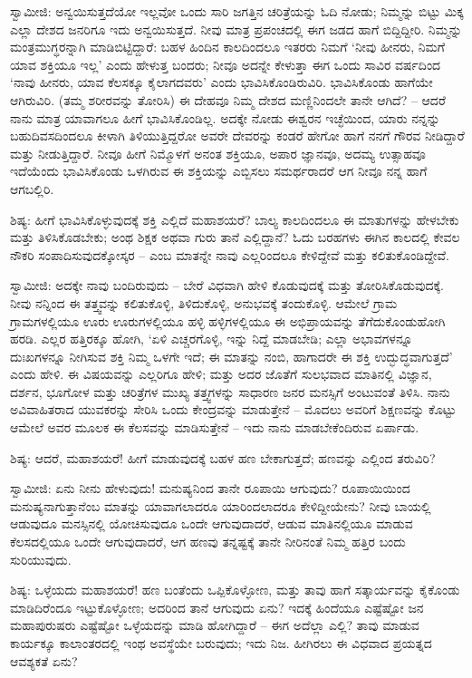 ಸ್ವಾಮೀಜಿ: ಅನ್ವಯಿಸುತ್ತದೆಯೋ ಇಲ್ಲವೋ ಒಂದು ಸಾರಿ ಜಗತ್ತಿನ ಚರಿತ್ರೆಯನ್ನು ಓದಿ ನೋಡು; ನಿಮ್ಮನ್ನು ಬಿಟ್ಟು ಮಿಕ್ಕ ಎಲ್ಲಾ ದೇಶದ ಜನರಿಗೂ ಇದು ಅನ್ವಯಿಸುತ್ತದೆ. ನೀವು ಮಾತ್ರ ಪ್ರಪಂಚದಲ್ಲಿ ಈಗ ಜಡದ ಹಾಗೆ ಬಿದ್ದಿದ್ದೀರಿ. ನಿಮ್ಮನ್ನು ಮಂತ್ರಮುಗ್ಧರನ್ನಾಗಿ ಮಾಡಿಬಿಟ್ಟಿದ್ದಾರೆ: ಬಹಳ ಹಿಂದಿನ ಕಾಲದಿಂದಲೂ ಇತರರು ನಿಮಗೆ ‘ನೀವು ಹೀನರು, ನಿಮಗೆ ಯಾವ ಶಕ್ತಿಯೂ ಇಲ್ಲ’ ಎಂದು ಹೇಳುತ್ತ ಬಂದರು; ನೀವೂ ಅದನ್ನೇ ಕೇಳುತ್ತಾ ಈಗ ಒಂದು ಸಾವಿರ ವರ್ಷದಿಂದ ‘ನಾವು ಹೀನರು, ಯಾವ ಕೆಲಸಕ್ಕೂ ಕೈಲಾಗದವರು’ ಎಂದು ಭಾವಿಸಿಕೊಂಡಿರುವಿರಿ. ಭಾವಿಸಿಕೊಂಡು ಹಾಗೆಯೇ ಆಗಿರುವಿರಿ. (ತಮ್ಮ ಶರೀರವನ್ನು ತೋರಿಸಿ) ಈ ದೇಹವೂ ನಿಮ್ಮ ದೇಶದ ಮಣ್ಣಿನಿಂದಲೇ ತಾನೇ ಆಗಿದೆ? – ಆದರೆ ನಾನು ಮಾತ್ರ ಯಾವಾಗಲೂ ಹೀಗೆ ಭಾವಿಸಿಕೊಂಡಿಲ್ಲ. ಅದಕ್ಕೇ ನೋಡು ಈಶ್ವರನ ಇಚ್ಛೆಯಿಂದ, ಯಾರು ನನ್ನನ್ನು ಬಹುದಿವಸದಿಂದಲೂ ಕೀಳಾಗಿ ತಿಳಿಯುತ್ತಿದ್ದರೋ ಅವರೇ ದೇವರನ್ನು ಕಂಡರೆ ಹೇಗೋ ಹಾಗೆ ನನಗೆ ಗೌರವ ನೀಡಿದ್ದಾರೆ ಮತ್ತು ನೀಡುತ್ತಿದ್ದಾರೆ. ನೀವೂ ಹೀಗೆ ನಿಮ್ಮೊಳಗೆ ಅನಂತ ಶಕ್ತಿಯೂ, ಅಪಾರ ಜ್ಞಾನವೂ, ಅದಮ್ಯ ಉತ್ಸಾಹವೂ ಇದೆಯೆಂದು ಭಾವಿಸಿಕೊಂಡು ಒಳಗಿರುವ ಈ ಶಕ್ತಿಯನ್ನು ಎಬ್ಬಿಸಲು ಸಮರ್ಥರಾದರೆ ಆಗ ನೀವೂ ನನ್ನ ಹಾಗೆ ಆಗಬಲ್ಲಿರಿ.

ಶಿಷ್ಯ: ಹೀಗೆ ಭಾವಿಸಿಕೊಳ್ಳುವುದಕ್ಕೆ ಶಕ್ತಿ ಎಲ್ಲಿದೆ ಮಹಾಶಯರೆ? ಬಾಲ್ಯ ಕಾಲದಿಂದಲೂ ಈ ಮಾತುಗಳನ್ನು ಹೇಳಬೇಕು ಮತ್ತು ತಿಳಿಸಿಕೊಡಬೇಕು; ಅಂಥ ಶಿಕ್ಷಕ ಅಥವಾ ಗುರು ತಾನೆ ಎಲ್ಲಿದ್ದಾನೆ? ಓದು ಬರಹಗಳು ಈಗಿನ ಕಾಲದಲ್ಲಿ ಕೇವಲ ನೌಕರಿ ಸಂಪಾದಿಸುವುದಕ್ಕೋಸ್ಕರ – ಎಂಬ ಮಾತನ್ನೇ ನಾವು ಎಲ್ಲರಿಂದಲೂ ಕೇಳಿದ್ದೇವೆ ಮತ್ತು ಕಲಿತುಕೊಂಡಿದ್ದೇವೆ.

ಸ್ವಾಮೀಜಿ: ಅದಕ್ಕೇ ನಾವು ಬಂದಿರುವುದು – ಬೇರೆ ವಿಧವಾಗಿ ಹೇಳಿ ಕೊಡುವುದಕ್ಕೆ ಮತ್ತು ತೋರಿಸಿಕೊಡುವುದಕ್ಕೆ. ನೀವು ನನ್ನಿಂದ ಈ ತತ್ತ್ವವನ್ನು ಕಲಿತುಕೊಳ್ಳಿ, ತಿಳಿದುಕೊಳ್ಳಿ, ಅನುಭವಕ್ಕೆ ತಂದುಕೊಳ್ಳಿ. ಆಮೇಲೆ ಗ್ರಾಮ ಗ್ರಾಮಗಳಲ್ಲಿಯೂ ಊರು ಊರುಗಳಲ್ಲಿಯೂ ಹಳ್ಳಿ ಹಳ್ಳಿಗಳಲ್ಲಿಯೂ ಈ ಅಭಿಪ್ರಾಯವನ್ನು ತೆಗೆದುಕೊಂಡುಹೋಗಿ ಹರಡಿ. ಎಲ್ಲರ ಹತ್ತಿರಕ್ಕೂ ಹೋಗಿ, ‘ಏಳಿ ಎಚ್ಚರಗೊಳ್ಳಿ, ಇನ್ನು ನಿದ್ದೆ ಮಾಡಬೇಡಿ; ಎಲ್ಲಾ ಅಭಾವಗಳನ್ನೂ ದುಃಖಗಳನ್ನೂ ನೀಗಿಸುವ ಶಕ್ತಿ ನಿಮ್ಮ ಒಳಗೇ ಇದೆ; ಈ ಮಾತನ್ನು ನಂಬಿ, ಹಾಗಾದರೇ ಈ ಶಕ್ತಿ ಉದ್ಭುದ್ಧವಾಗುತ್ತದೆ’ ಎಂದು ಹೇಳಿ. ಈ ವಿಷಯವನ್ನು ಎಲ್ಲರಿಗೂ ಹೇಳಿ; ಮತ್ತು ಅದರ ಜೊತೆಗೆ ಸುಲಭವಾದ ಮಾತಿನಲ್ಲಿ ವಿಜ್ಞಾನ, ದರ್ಶನ, ಭೂಗೋಳ ಮತ್ತು ಚರಿತ್ರೆಗಳ ಮುಖ್ಯ ತತ್ತ್ವಗಳನ್ನು ಸಾಧಾರಣ ಜನರ ಮನಸ್ಸಿಗೆ ಅಂಟುವಂತೆ ತಿಳಿಸಿ. ನಾನು ಅವಿವಾಹಿತರಾದ ಯುವಕರನ್ನು ಸೇರಿಸಿ ಒಂದು ಕೇಂದ್ರವನ್ನು ಮಾಡುತ್ತೇನೆ – ಮೊದಲು ಅವರಿಗೆ ಶಿಕ್ಷಣವನ್ನು ಕೊಟ್ಟು ಆಮೇಲೆ ಅವರ ಮೂಲಕ ಈ ಕೆಲಸವನ್ನು ಮಾಡಿಸುತ್ತೇನೆ – ಇದು ನಾನು ಮಾಡಬೇಕೆಂದಿರುವ ಏರ್ಪಾಡು.

ಶಿಷ್ಯ: ಆದರೆ, ಮಹಾಶಯರೆ! ಹೀಗೆ ಮಾಡುವುದಕ್ಕೆ ಬಹಳ ಹಣ ಬೇಕಾಗುತ್ತದೆ; ಹಣವನ್ನು ಎಲ್ಲಿಂದ ತರುವಿರಿ?

ಸ್ವಾಮೀಜಿ: ಏನು ನೀನು ಹೇಳುವುದು! ಮನುಷ್ಯನಿಂದ ತಾನೇ ರೂಪಾಯಿ ಆಗುವುದು? ರೂಪಾಯಿಯಿಂದ ಮನುಷ್ಯನಾಗುತ್ತಾನೆಂಬ ಮಾತನ್ನು ಯಾವಾಗಲಾದರೂ ಯಾರಿಂದಲಾದರೂ ಕೇಳಿದ್ದೀಯೇನು? ನೀವು ಬಾಯಲ್ಲಿ ಆಡುವುದೂ ಮನಸ್ಸಿನಲ್ಲಿ ಯೋಚಿಸುವುದೂ ಒಂದೇ ಆಗುವುದಾದರೆ, ಆಡುವ ಮಾತಿನಲ್ಲಿಯೂ ಮಾಡುವ ಕೆಲಸದಲ್ಲಿಯೂ ಒಂದೇ ಆಗುವುದಾದರೆ, ಆಗ ಹಣವು ತನ್ನಷ್ಟಕ್ಕೆ ತಾನೇ ನೀರಿನಂತೆ ನಿಮ್ಮ ಹತ್ತಿರ ಬಂದು ಸುರಿಯುವುದು.

ಶಿಷ್ಯ: ಒಳ್ಳೆಯದು ಮಹಾಶಯರೆ! ಹಣ ಬಂತೆಂದು ಒಪ್ಪಿಕೊಳ್ಳೋಣ, ಮತ್ತು ತಾವು ಹಾಗೆ ಸತ್ಕಾರ್ಯವನ್ನು ಕೈಕೊಂಡು ಮಾಡಿದಿರೆಂದೂ ಇಟ್ಟುಕೊಳ್ಳೋಣ; ಅದರಿಂದ ತಾನೆ ಆಗುವುದು ಏನು? ಇದಕ್ಕೆ ಹಿಂದೆಯೂ ಎಷ್ಟೆಷ್ಟೋ ಜನ ಮಹಾಪುರುಷರು ಎಷ್ಟೆಷ್ಟೋ ಒಳ್ಳೆಯದನ್ನು ಮಾಡಿ ಹೋಗಿದ್ದಾರೆ – ಈಗ ಅದೆಲ್ಲಾ ಎಲ್ಲಿ? ತಾವು ಮಾಡುವ ಕಾರ್ಯಕ್ಕೂ ಕಾಲಾಂತರದಲ್ಲಿ ಇಂಥ ಅವಸ್ಥೆಯೇ ಬರುವುದು; ಇದು ನಿಜ. ಹೀಗಿರಲು ಈ ವಿಧವಾದ ಪ್ರಯತ್ನದ ಆವಶ್ಯಕತೆ ಏನು?

